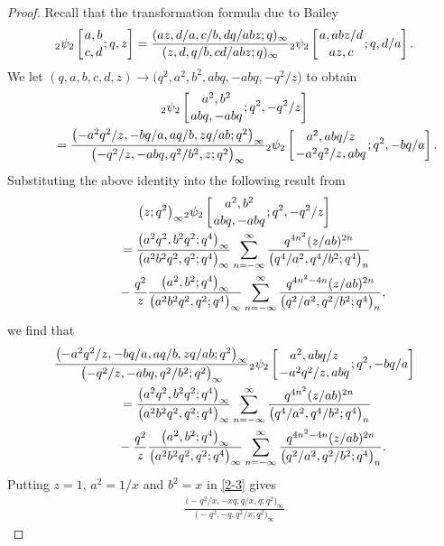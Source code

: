 \documentclass[pdftex]{sigma}
\numberwithin{equation}{section}
\begin{document}
\begin{proof}
Recall that the transformation formula due to Bailey \cite[equation~(2.3)]{Ba}
\begin{align*}
_2\psi_2\left[{a,b \atop c,d};q,z\right]
=\frac{(az,d/a,c/b,dq/abz;q)_{\infty}}
{(z,d,q/b,cd/abz;q)_{\infty}}
{_2\psi_2}\left[{a,abz/d \atop az,c};q,d/a\right].
\end{align*}
We let $(q,a,b,c,d,z)\rightarrow\bigl(q^2,a^2,b^2,abq,-abq,-q^2/z\bigr)$ to obtain
\begin{gather*}
{_2\psi_2}\left[{a^2, b^2 \atop abq,-abq};q^2,-q^2/z\right]\\
\qquad=\frac{\bigl(-a^2q^2/z,-bq/a,aq/b,zq/ab;q^2\bigr)_{\infty}}
{\bigl(-q^2/z,-abq,q^2/b^2,z;q^2\bigr)_{\infty}}
{_2\psi_2}\left[{a^2,abq/z \atop -a^2q^2/z,abq};q^2,-bq/a\right].
\end{gather*}
Substituting the above identity into the following result from \cite[Theorem 2.3]{HZ}
\begin{gather}
\bigl(z;q^2\bigr)_{\infty}{_2\psi_2}\left[{a^2, b^2 \atop abq,-abq};q^2,-q^2/z\right]\nonumber\\
\qquad=\frac{\bigl(a^2q^2,b^2q^2;q^4\bigr)_{\infty}}{\bigl(a^2b^2q^2,q^2;q^4\bigr)_{\infty}}
\sum_{n=-\infty}^{\infty}\frac{q^{4n^2}(z/ab)^{2n}}
{\bigl(q^4/a^2,q^4/b^2;q^4\bigr)_n}\nonumber\\
\phantom{\qquad=}{}-\frac{q^2}{z}\frac{\bigl(a^2,b^2;q^4\bigr)_{\infty}}{\bigl(a^2b^2q^2,q^2;q^4\bigr)_{\infty}}
\sum_{n=-\infty}^{\infty}\frac{q^{4n^2-4n}(z/ab)^{2n}}
{\bigl(q^2/a^2,q^2/b^2;q^4\bigr)_n},\label{2-2}
\end{gather}
we find that
\begin{gather}
\frac{\bigl(-a^2q^2/z,-bq/a,aq/b,zq/ab;q^2\bigr)_{\infty}}
{\bigl(-q^2/z,-abq,q^2/b^2;q^2\bigr)_{\infty}}
{_2\psi_2}\left[{a^2,abq/z \atop -a^2q^2/z,abq};q^2,-bq/a\right]\nonumber\\
\qquad=\frac{\bigl(a^2q^2,b^2q^2;q^4\bigr)_{\infty}}{\bigl(a^2b^2q^2,q^2;q^4\bigr)_{\infty}}
\sum_{n=-\infty}^{\infty}\frac{q^{4n^2}(z/ab)^{2n}}
{\bigl(q^4/a^2,q^4/b^2;q^4\bigr)_n}\nonumber\\
\phantom{\qquad=}{}-\frac{q^2}{z}\frac{\bigl(a^2,b^2;q^4\bigr)_{\infty}}{\bigl(a^2b^2q^2,q^2;q^4\bigr)_{\infty}}
\sum_{n=-\infty}^{\infty}\frac{q^{4n^2-4n}(z/ab)^{2n}}
{\bigl(q^2/a^2,q^2/b^2;q^4\bigr)_n}.\label{2-3}
\end{gather}
Putting $z=1$, $a^2=1/x$ and $b^2=x$ in \eqref{2-3} gives
\begin{gather}
\frac{\bigl(-q^2/x,-xq,q/x,q;q^2\bigr)_{\infty}}{\bigl(-q^2,-q,q^2/x;q^2\bigr)_{\infty}}

\end{gather}
\end{proof}
\end{document}
